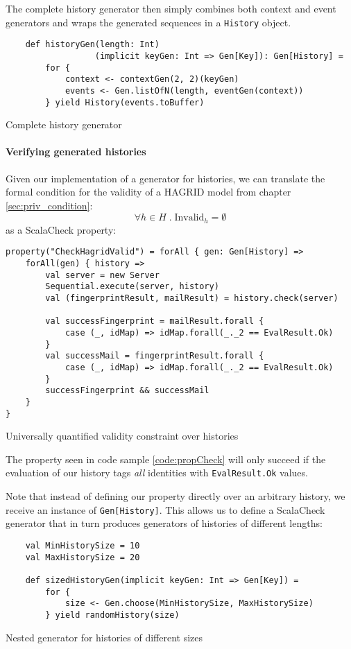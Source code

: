 The complete history generator then simply combines both context and event generators and wraps the generated sequences in a \texttt{History} object.
\begin{code}
    \begin{verbatim}
    def historyGen(length: Int)
                  (implicit keyGen: Int => Gen[Key]): Gen[History] =
        for {
            context <- contextGen(2, 2)(keyGen)
            events <- Gen.listOfN(length, eventGen(context))
        } yield History(events.toBuffer)
    \end{verbatim}
    \caption{Complete history generator}
\end{code}

\paragraph{Verifying generated histories}
Given our implementation of a generator for histories, we can translate the formal condition for the validity of a HAGRID model from chapter \ref{sec:priv_condition}:
\[
    \forall h \in H \; .\; \text{Invalid}_h = \emptyset
\]
as a ScalaCheck property:
\begin{code}
    \begin{verbatim}
property("CheckHagridValid") = forAll { gen: Gen[History] =>
    forAll(gen) { history =>
        val server = new Server
        Sequential.execute(server, history)
        val (fingerprintResult, mailResult) = history.check(server)

        val successFingerprint = mailResult.forall {
            case (_, idMap) => idMap.forall(_._2 == EvalResult.Ok)
        }
        val successMail = fingerprintResult.forall {
            case (_, idMap) => idMap.forall(_._2 == EvalResult.Ok)
        }
        successFingerprint && successMail
    }
}
    \end{verbatim}
    \caption{Universally quantified validity constraint over histories}
    \label{code:propCheck}
\end{code}
The property seen in code sample \ref{code:propCheck} will only succeed if the evaluation of our history tags \emph{all} identities with \texttt{EvalResult.Ok} values.

Note that instead of defining our property directly over an arbitrary history, we receive an instance of \texttt{Gen[History]}. This allows us to define a ScalaCheck generator that in turn produces generators of histories of different lengths: 
\begin{code}
    \begin{verbatim}
    val MinHistorySize = 10
    val MaxHistorySize = 20

    def sizedHistoryGen(implicit keyGen: Int => Gen[Key]) =
        for {
            size <- Gen.choose(MinHistorySize, MaxHistorySize)
        } yield randomHistory(size)
    \end{verbatim}
    \caption{Nested generator for histories of different sizes}
\end{code}

